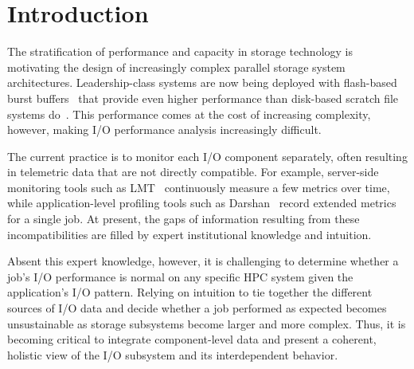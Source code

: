 \section{Introduction} \label{sec:introduction}

The stratification of performance and capacity in storage technology is motivating the design of increasingly complex parallel storage system architectures.
Leadership-class systems are now being deployed with flash-based burst buffers~\cite{Henseler2016} that provide even higher performance than disk-based scratch file systems do~\cite{Bhimji2016}.
This performance comes at the cost of increasing complexity, however, making I/O performance analysis increasingly difficult.

The current practice is to monitor each I/O component 
separately, often resulting in telemetric data that are not directly compatible.
For example, server-side monitoring tools such as LMT~\cite{lmt}
continuously measure a few metrics over time, while application-level
profiling tools such as Darshan~\cite{carns200924} record extended metrics
for a single job.
At present, the gaps of information resulting from these incompatibilities are filled by expert institutional knowledge and intuition.

Absent this expert knowledge, however, it is challenging to determine whether a job's I/O performance is normal on any specific HPC system given the application's I/O pattern.
Relying on intuition to tie together the different sources of I/O data and decide whether a job performed as expected becomes unsustainable as storage subsystems become larger and more complex.  
Thus, it is becoming critical to integrate component-level data and present a coherent, holistic view of the I/O subsystem and its interdependent behavior.

